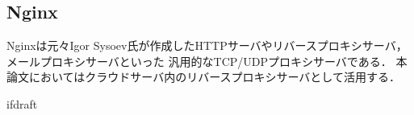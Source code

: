\documentclass[12pt]{honka_v1}
\begin{document}
\subsection{Nginx}
Nginxは元々Igor Sysoev氏が作成したHTTPサーバやリバースプロキシサーバ，メールプロキシサーバといった
汎用的なTCP/UDPプロキシサーバである\cite{bib:nginx-web}．
本論文においてはクラウドサーバ内のリバースプロキシサーバとして活用する．









\expandafter\ifx\csname ifdraft\endcsname\relax
    \newcommand{\ifdraft}{false}
    
    
\end{document}
